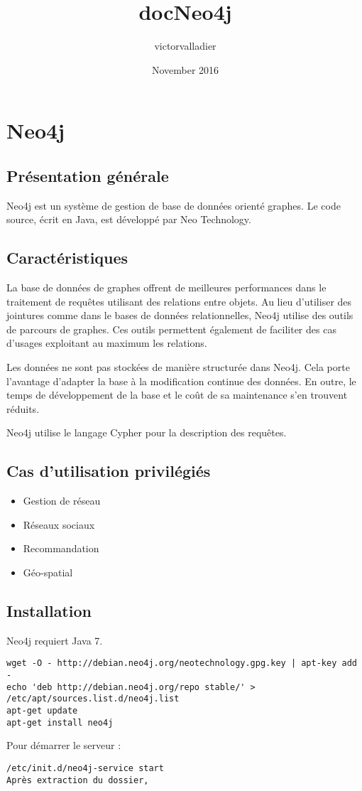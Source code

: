 \documentclass{article}
\title{docNeo4j}
\author{victorvalladier}
\date{November 2016}
\begin{document}
\section{Neo4j}

\subsection{Présentation générale}

Neo4j est un système de gestion de base de données orienté graphes. Le code source, écrit en Java, est développé par Neo Technology.

\subsection{Caractéristiques}

La base de données de graphes offrent de meilleures performances dans le traitement de requêtes utilisant des relations entre objets. Au lieu d'utiliser des jointures comme dans le bases de données relationnelles, Neo4j utilise des outils de parcours de graphes. Ces outils permettent également de faciliter des cas d'usages exploitant au maximum les relations.

Les données ne sont pas stockées de manière structurée dans Neo4j. Cela porte l'avantage d'adapter la base à la modification continue des données. En outre, le temps de développement de la base et le coût de sa maintenance s'en trouvent réduits.

Neo4j utilise le langage Cypher pour la description des requêtes. 

\subsection{Cas d'utilisation privilégiés}

\begin{itemize}
      \item Gestion de réseau
      \item Réseaux sociaux
      \item Recommandation
      \item Géo-spatial
\end{itemize}

\subsection{Installation}

Neo4j requiert Java 7.

\begin{lstlisting}
wget -O - http://debian.neo4j.org/neotechnology.gpg.key | apt-key add -
echo 'deb http://debian.neo4j.org/repo stable/' > /etc/apt/sources.list.d/neo4j.list
apt-get update
apt-get install neo4j
\end{lstlisting}

Pour démarrer le serveur :
\begin{lstlisting}
/etc/init.d/neo4j-service start
Après extraction du dossier, 
\end{lstlisting}
\end{document}
